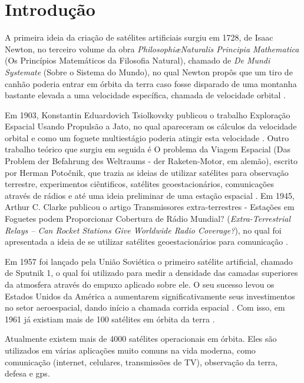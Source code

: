 \chapter{Introdução}

A primeira ideia da criação de satélites artificiais surgiu em 1728, de Isaac Newton, no terceiro volume da obra \textit{Philosophi\ae Naturalis Principia Mathematica} (Os Princípios Matemáticos da Filosofia Natural), chamado de \textit{De Mundi Systemate} (Sobre o Sistema do Mundo), no qual Newton propôs que um tiro de canhão poderia entrar em órbita da terra caso fosse disparado de uma montanha bastante elevada a uma velocidade específica, chamada de velocidade orbital \cite{newton1728}.

Em 1903, Konstantin Eduardovich Tsiolkovsky publicou o trabalho Exploração Espacial Usando Propulsão a Jato, no qual apareceram os cálculos da velocidade orbital e como um foguete multiestágio poderia atingir esta velocidade \cite{maul2012}. Outro trabalho teórico que surgiu em seguida é O problema da Viagem Espacial (Das Problem der Befahrung des Weltraums - der Raketen-Motor, em alemão), escrito por Herman Poto\v{c}nik, que trazia as ideias de utilizar satélites para observação terrestre, experimentos ciêntificos, satélites geoestacionários, comunicações através de rádios e até uma ideia preliminar de uma estação espacial \cite{potocnik1929}. Em 1945, Arthur C. Clarke publicou o artigo Transmissores extra-terrestres - Estações em Foguetes podem Proporcionar Cobertura de Rádio Mundial? (\textit{Extra-Terrestrial Relays – Can Rocket Stations Give Worldwide Radio Coverage?}), no qual foi apresentada a ideia de se utilizar satélites geoestacionários para comunicação \cite{Clarke1945}.

Em 1957 foi lançado pela União Soviética o primeiro satélite artificial, chamado de Sputnik 1, o qual foi utilizado para medir a densidade das camadas superiores da atmosfera através do empuxo aplicado sobre ele. O seu sucesso levou os Estados Unidos da América a aumentarem significativamente seus investimentos no setor aeroespacial, dando início a chamada corrida espacial \cite{McQuaid2017}. Com isso, em 1961 já existiam mais de 100 satélites em órbita da terra \cite{Portree1999}.

Atualmente existem mais de 4000 satélites operacionais em órbita. Eles são utilizados em várias aplicações muito comuns na vida moderna, como comunicação (internet, celulares, transmissões de TV), observação da terra, defesa e \gls{gps}\cite{spaceObjectsIndex2017}.

